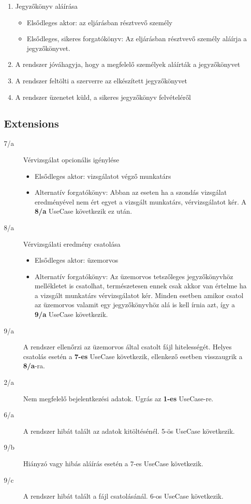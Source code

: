 \begin{enumerate}
	\item Jegyzőkönyv aláírása
	\begin{itemize}
		\item Elsődleges aktor: az eljárásban résztvevő személy 
		\item Elsődleges, sikeres forgatókönyv: Az eljárásban résztvevő személy aláírja a jegyzőkönyvet.
	\end{itemize}
	\item A rendszer jóváhagyja, hogy a megfelelő személyek aláírták a jegyzőkönyvet
	\item A rendszer feltölti a szerverre az elkészített jegyzőkönyvet
	\item A rendszer üzenetet küld, a sikeres jegyzőkönyv felvételéről
\end{enumerate}

\subsection{Extensions}
\begin{description}
	\item [7/a] Vérvizsgálat opcionális igénylése
		\begin{itemize}
			\item Elsődleges aktor: vizsgálatot végző munkatárs
			\item Alternatív forgatókönyv: Abban az eseten ha a szondás vizsgálat eredményével nem ért egyet a vizsgált munkatárs, vérvizsgálatot kér. A \textbf{8/a} UseCase következik ez után.
		\end{itemize}
	\item [8/a] Vérvizsgálati eredmény csatolása
		\begin{itemize}
			\item Elsődleges aktor: üzemorvos
			\item Alternatív forgatókönyv:  Az üzemorvos tetszőleges jegyzőkönyvhöz mellékletet is csatolhat, természetesen ennek csak akkor van értelme ha a vizsgált munkatárs vérvizsgálatot kér. Minden esetben amikor csatol az üzemorvos valamit egy jegyzőkönyvhöz alá is kell írnia azt, így a \textbf{9/a} UseCase következik.
		\end{itemize}
	\item [9/a] A rendszer ellenőrzi az üzemorvos által csatolt fájl hitelességét. Helyes csatolás esetén a \textbf{7-es} UseCase következik, ellenkező esetben visszaugrik a \textbf{8/a}-ra.
	\item [2/a] Nem megfelelő bejelentkezési adatok. Ugrás az \textbf{1-es} UseCase-re.
	\item [6/a] A rendszer hibát talált az adatok kitöltésénél. 5-ös UseCase következik.
	\item [9/b] Hiányzó vagy hibás aláírás esetén a 7-es UseCase következik.
	\item [9/c] A rendszer hibát talált a fájl csatolásánál. 6-os UseCase következik.
\end{description}

